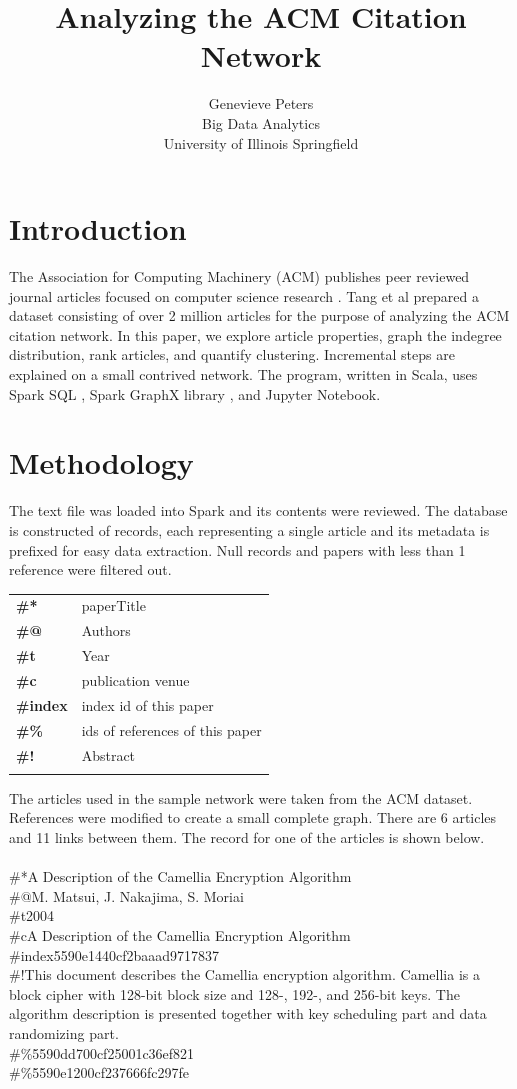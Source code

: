 \documentclass[journal]{IEEEtran}
\title{Analyzing the ACM Citation Network}
\author{Genevieve Peters\\{Big Data Analytics\\University of Illinois Springfield}}
\begin{document}
\maketitle
\section{Introduction} 
The Association for Computing Machinery (ACM) publishes peer reviewed journal articles focused on computer science research \cite{acm}. Tang et al \cite{tang} prepared a dataset consisting of over 2 million articles for the purpose of analyzing the ACM citation network. In this paper, we explore article properties, graph the indegree distribution, rank articles, and quantify clustering. Incremental steps are explained on a small contrived network. The program, written in Scala, uses Spark SQL \cite{sparksql}, Spark GraphX library \cite{graphx}, and Jupyter Notebook.
\section{Methodology} 
The text file was loaded into Spark and its contents were reviewed. The database \cite{tang} is constructed of records, each representing a single article and its metadata is prefixed for easy data extraction. Null records and papers with less than 1 reference were filtered out.\\
\begin{center}
\begin{tabular}{@{}ll}
\textbf{\#*}		& paperTitle \\
\textbf{\#@}	& Authors \\
\textbf{\#t}		& Year \\
\textbf{\#c}		& publication venue \\
\textbf{\#index}	& index id of this paper \\
\textbf{\#\%}	& ids of references of this paper \\
\textbf{\#!}		& Abstract \\\\
\end{tabular}
\end{center}

The articles used in the sample network were taken from the ACM dataset. References were modified to create a small complete graph. There are 6 articles and 11 links between them. The record for one of the articles is shown below.\\\\
\small \#*A Description of the Camellia Encryption Algorithm\\
\#@M. Matsui, J. Nakajima, S. Moriai\\
\#t2004\\
\#cA Description of the Camellia Encryption Algorithm\\
\#index5590e1440cf2baaad9717837\\
\#!This document describes the Camellia encryption algorithm. Camellia is a block cipher with 128-bit block size and 128-, 192-, and 256-bit keys. The algorithm description is presented together with key scheduling part and data randomizing part.\\
\#\%5590dd700cf25001c36ef821\\
\#\%5590e1200cf237666fc297fe
\normalsize
\end{document}
